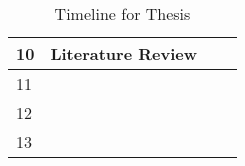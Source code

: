 \begin{table}[ht]
{\begin{tabular}{|l|l|l|l|}
            10   & \cellcolor[HTML]{9B9B9B}Literature Review             & \cellcolor[HTML]{C0C0C0}                           & \cellcolor[HTML]{C0C0C0}                            \\ \hline
            11   & \cellcolor[HTML]{C0C0C0}                              & \cellcolor[HTML]{C0C0C0}                           & \cellcolor[HTML]{C0C0C0}                            \\ \hline
            12   & \cellcolor[HTML]{C0C0C0}                              & \cellcolor[HTML]{C0C0C0}                           & \cellcolor[HTML]{C0C0C0}                            \\ \hline
            13   & \cellcolor[HTML]{C0C0C0}                              & \cellcolor[HTML]{C0C0C0}                           & \cellcolor[HTML]{C0C0C0}                            \\ \hline
        \end{tabular}
    }
    \caption{Timeline for Thesis}
    \label{tab:timeline}
\end{table}